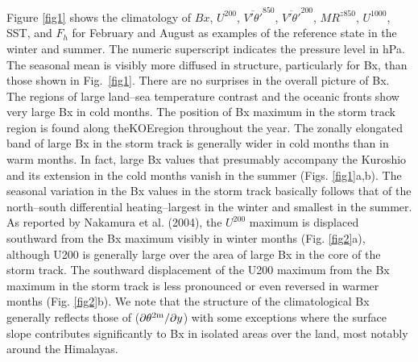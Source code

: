 \documentclass{ametsocv6.1}
\begin{document}
Figure \ref{fig1} shows the climatology of $Bx$, $U^{200}$,
$\overline{V'\theta'}^{850}$, $\overline{V'\theta'}^{200}$, 
$MR^{z850}$, $U^{1000}$, SST, and $F_h$ for February and
August as examples of the reference state in the winter
and summer. The numeric superscript indicates the pressure
level in hPa. The seasonal mean is visibly more
diffused in structure, particularly for Bx, than those
shown in Fig.~\ref{fig1}. There are no surprises in the overall
picture of Bx. The regions of large land--sea temperature
contrast and the oceanic fronts show very large Bx in cold
months. The position of Bx maximum in the storm track
region is found along theKOEregion throughout the year.
The zonally elongated band of large Bx in the storm track
is generally wider in cold months than in warm months.
In fact, large Bx values that presumably accompany the
Kuroshio and its extension in the cold months vanish in
the summer (Figs. \ref{fig1}a,b). The seasonal variation in the Bx
values in the storm track basically follows that of the
north--south differential heating--largest in the winter and
smallest in the summer. As reported by Nakamura et al.
(2004), the $U^{200}$ maximum is displaced southward from the
Bx maximum visibly in winter months (Fig. \ref{fig2}a), although
U200 is generally large over the area of large Bx in the core
of the storm track. The southward displacement of the
U200 maximum from the Bx maximum in the storm track
is less pronounced or even reversed in warmer months
(Fig. \ref{fig2}b). We note that the structure of the climatological
Bx generally reflects those of ($\partial{\theta^{2{\textrm m}}}/\partial{y}$) with some exceptions where
the surface slope contributes significantly to Bx
in isolated areas over the land, most notably around the
Himalayas.
\end{document}
